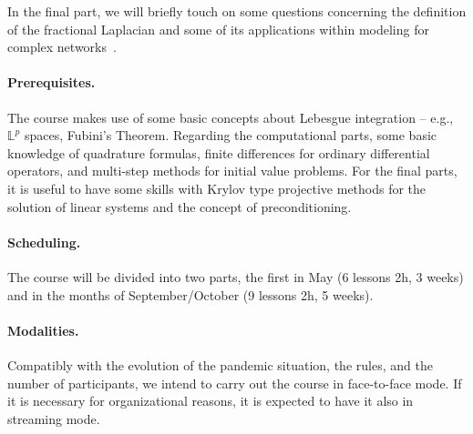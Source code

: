 \documentclass[a4paper]{article}
\begin{document}
In the final part, we will briefly touch on some questions concerning
the definition of the fractional Laplacian and some of its applications within
modeling for complex networks~\cite{ArrigoDurastante,cnaa017,RiascosBook}.

\paragraph{Prerequisites.} The course makes use of some basic concepts about 
Lebesgue integration -- e.g., $\mathbb{L}^p$ spaces, Fubini's Theorem. Regarding the computational parts, some basic knowledge of quadrature formulas, finite differences for ordinary differential operators, and multi-step methods for initial value problems. For the final parts, it is useful to have some skills with Krylov type projective methods for the solution of linear systems and the concept of preconditioning.

\paragraph{Scheduling.} The course will be divided into two parts, the first in May (6 lessons 2h, 3 weeks) 
and in the months of September/October (9 lessons 2h, 5 weeks).

\paragraph{Modalities.} Compatibly with the evolution of the pandemic situation, the rules, and the number of participants, we intend to carry out the course in face-to-face mode. If it is necessary for organizational reasons, it is expected 
to have it also in streaming mode.

\printbibliography
\end{document}
